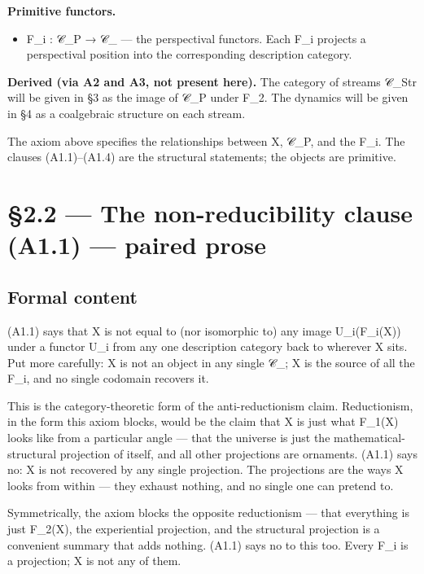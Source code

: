\documentclass[11pt, openany]{book}
\newcommand{\sectionbreak}{\clearpage}
\begin{document}
\textbf{Primitive functors.}
\begin{itemize}
\item F\_\allowbreak{}i : 𝒞\_\allowbreak{}P → 𝒞\_ --- the perspectival functors. Each F\_\allowbreak{}i projects a perspectival position into the corresponding description category.
\end{itemize}

\textbf{Derived (via A2 and A3, not present here).} The category of streams 𝒞\_\allowbreak{}Str will be given in §3 as the image of 𝒞\_\allowbreak{}P under F\_\allowbreak{}2. The dynamics will be given in §4 as a coalgebraic structure on each stream.

The axiom above specifies the relationships between X, 𝒞\_\allowbreak{}P, and the F\_\allowbreak{}i. The clauses (A1.1)–(A1.4) are the structural statements; the objects are primitive.

\sectionbreak

\section{§2.2 --- The non-reducibility clause (A1.1) --- paired prose}

\subsection{Formal content}

(A1.1) says that X is not equal to (nor isomorphic to) any image U\_\allowbreak{}i(F\_\allowbreak{}i(X)) under a functor U\_\allowbreak{}i from any one description category back to wherever X sits. Put more carefully: X is not an object in any single 𝒞\_; X is the source of all the F\_\allowbreak{}i, and no single codomain recovers it.

This is the category-theoretic form of the anti-reductionism claim. Reductionism, in the form this axiom blocks, would be the claim that X is just what F\_\allowbreak{}1(X) looks like from a particular angle --- that the universe is just the mathematical-structural projection of itself, and all other projections are ornaments. (A1.1) says no: X is not recovered by any single projection. The projections are the ways X looks from within --- they exhaust nothing, and no single one can pretend to.

Symmetrically, the axiom blocks the opposite reductionism --- that everything is just F\_\allowbreak{}2(X), the experiential projection, and the structural projection is a convenient summary that adds nothing. (A1.1) says no to this too. Every F\_\allowbreak{}i is a projection; X is not any of them.
\end{document}
